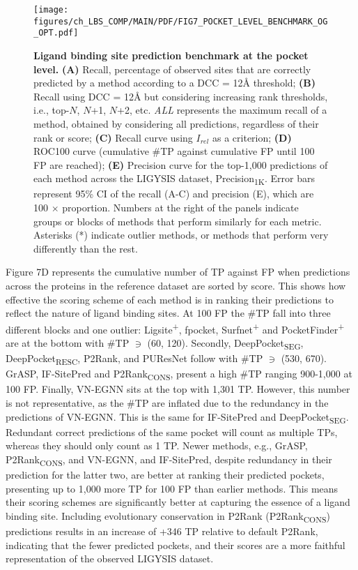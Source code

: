 \begin{figure}[ht!]
    \centering
    \texttt{[image: figures/ch\_LBS\_COMP/MAIN/PDF/FIG7\_POCKET\_LEVEL\_BENCHMARK\_OG\_OPT.pdf]}
    \caption[Ligand binding site prediction benchmark at the pocket level]{\textbf{Ligand binding site prediction benchmark at the pocket level.} \textbf{(A)} Recall, percentage of observed sites that are correctly predicted by a method according to a DCC = 12\AA{} threshold; \textbf{(B)} Recall using DCC = 12\AA{} but considering increasing rank thresholds, i.e., top-$N$, $N$+1, $N$+2, etc. \textit{ALL} represents the maximum recall of a method, obtained by considering all predictions, regardless of their rank or score; \textbf{(C)} Recall curve using $I_{rel}$ as a criterion; \textbf{(D)} ROC100 curve  (cumulative \#TP against cumulative FP until 100 FP are reached); \textbf{(E)} Precision curve for the top-1,000 predictions of each method across the LIGYSIS dataset, Precision\textsubscript{1K}. Error bars represent 95\% CI of the recall (A-C) and precision (E), which are 100 $\times$ proportion. Numbers at the right of the panels indicate groups or blocks of methods that perform similarly for each metric. Asterisks (*) indicate outlier methods, or methods that perform very differently than the rest.}
    \label{fig:pocket_level_benchmark_OG}
\end{figure}

Figure 7D represents the cumulative number of TP against FP when predictions across the proteins in the reference dataset are sorted by score. This shows how effective the scoring scheme of each method is in ranking their predictions to reflect the nature of ligand binding sites. At 100 FP the \#TP fall into three different blocks and one outlier: Ligsite\textsuperscript{+}, fpocket, Surfnet\textsuperscript{+} and PocketFinder\textsuperscript{+} are at the bottom with \#TP $\ni$ (60, 120). Secondly, DeepPocket\textsubscript{SEG}, DeepPocket\textsubscript{RESC}, P2Rank, and PUResNet follow with \#TP $\ni$ (530, 670). GrASP, IF-SitePred and P2Rank\textsubscript{CONS}, present a high \#TP ranging 900-1,000 at 100 FP. Finally, VN-EGNN sits at the top with 1,301 TP. However, this number is not representative, as the \#TP are inflated due to the redundancy in the predictions of VN-EGNN. This is the same for IF-SitePred and DeepPocket\textsubscript{SEG}. Redundant correct predictions of the same pocket will count as multiple TPs, whereas they should only count as 1 TP. Newer methods, e.g., GrASP, P2Rank\textsubscript{CONS}, and VN-EGNN, and IF-SitePred, despite redundancy in their prediction for the latter two, are better at ranking their predicted pockets, presenting up to 1,000 more TP for 100 FP than earlier methods. This means their scoring schemes are significantly better at capturing the essence of a ligand binding site. Including evolutionary conservation in P2Rank (P2Rank\textsubscript{CONS}) predictions results in an increase of +346 TP relative to default P2Rank, indicating that the fewer predicted pockets, and their scores are a more faithful representation of the observed LIGYSIS dataset.

